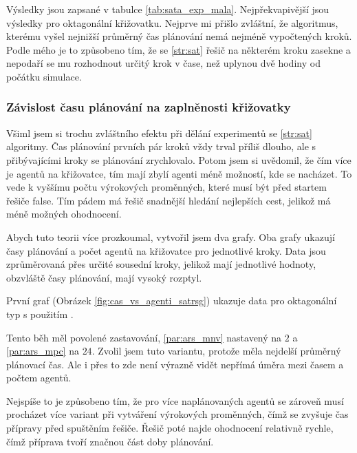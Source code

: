 Výsledky jsou zapsané v tabulce \ref{tab:sata_exp_mala}.
Nejpřekvapivější jsou výsledky pro oktagonální křižovatku.
Nejprve mi přišlo zvláštní, že algoritmus, kterému vyšel nejnižší průměrný čas plánování nemá nejméně vypočtených kroků.
Podle mého je to způsobeno tím, že se \ref{str:sat} řešič na některém kroku zasekne a nepodaří se mu rozhodnout
určitý krok v čase, než uplynou dvě hodiny od počátku simulace.



\subsubsection{Závislost času plánování na zaplněnosti křižovatky}
\label{subsubsec:sat_zavislost_casu_a_agentu}

Všiml jsem si trochu zvláštního efektu při dělání experimentů se \ref{str:sat} algoritmy.
Čas plánování prvních pár kroků vždy trval příliš dlouho, ale s přibývajícími kroky se plánování zrychlovalo.
Potom jsem si uvědomil, že čím více je agentů na křižovatce, tím mají zbylí agenti méně možností, kde se nacházet.
To vede k vyššímu počtu výrokových proměnných, které musí být před startem řešiče \textrm{false}.
Tím pádem má řešič snadnější hledání nejlepších cest, jelikož má méně možných ohodnocení.

Abych tuto teorii více prozkoumal, vytvořil jsem dva grafy.
Oba grafy ukazují časy plánování a počet agentů na křižovatce pro jednotlivé kroky.
Data jsou zprůměrovaná přes určité sousední kroky, jelikož mají jednotlivé hodnoty,
obzvláště časy plánování, mají vysoký rozptyl.

První graf (Obrázek \ref{fig:cas_vs_agenti_satrsg}) ukazuje data pro oktagonální typ s použitím .

Tento běh měl povolené zastavování, \ref{par:ars_mnv} nastavený na $2$ a \ref{par:ars_mpc} na $24$.
Zvolil jsem tuto variantu, protože měla nejdelší průměrný plánovací čas.
Ale i přes to zde není výrazně vidět nepřímá úměra mezi časem a počtem agentů.

Nejspíše to je způsobeno tím, že pro více naplánovaných agentů se zároveň musí procházet více variant
při vytváření výrokových proměnných, čímž se zvyšuje čas přípravy před spuštěním řešiče.
Řešič poté najde ohodnocení relativně rychle, čímž příprava tvoří značnou část doby plánování.

